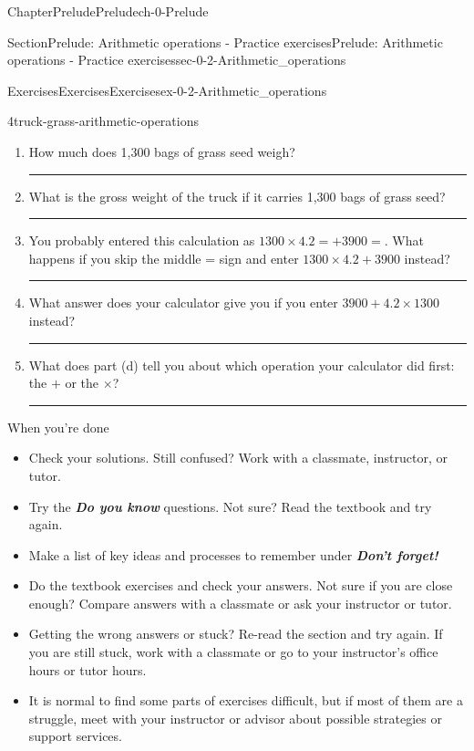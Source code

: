 \documentclass[twoside,11pt,]{book}
\newcommand{\alert}[1]{\textbf{\textit{#1}}}
\newlength{\workspacestrutwidth}
\numberwithin{equation}{section}
\begin{document}
\begin{chapterptx}{Chapter}{Prelude}{}{Prelude}{}{}{ch-0-Prelude}
\begin{sectionptx}{Section}{Prelude: Arithmetic operations - Practice exercises}{}{Prelude: Arithmetic operations - Practice exercises}{}{}{sec-0-2-Arithmetic_operations}
\begin{exercises-subsection-numberless}{Exercises}{Exercises}{}{Exercises}{}{}{ex-0-2-Arithmetic_operations}
\begin{divisionexercise}{4}{}{}{truck-grass-arithmetic-operations}
\begin{enumerate}[label=(\alph*),ref=\alph*]%
\item{}How much does 1,300 bags of grass seed weigh?%
\par\rule{\workspacestrutwidth}{0.35in}%
\item{}What is the gross weight of the truck if it carries 1,300 bags of grass seed?%
\par\rule{\workspacestrutwidth}{0.35in}%
\item{}You probably entered this calculation as \(1300 \times 4.2 = + 3900=\). What happens if you skip the middle = sign and enter \(1300 \times 4.2 + 3900\) instead?%
\par\rule{\workspacestrutwidth}{0.35in}%
\item{}What answer does your calculator give you if you enter \(3900 + 4.2 \times 1300\) instead?%
\par\rule{\workspacestrutwidth}{0.35in}%
\item{}What does part (d) tell you about which operation your calculator did first: the \(+\) or the \(\times\)?%
\par\rule{\workspacestrutwidth}{0.35in}%
\end{enumerate}%
\end{divisionexercise}%
\end{exercises-subsection-numberless}
\begin{conclusion}{When you're done \textellipsis{}}%
%
\begin{itemize}[label=\textbullet]
\item{}Check your solutions. Still confused? Work with a classmate, instructor, or tutor.%
\item{}Try the \alert{Do you know} questions. Not sure? Read the textbook and try again.%
\item{}Make a list of key ideas and processes to remember under \alert{Don't forget!}%
\item{}Do the textbook exercises and check your answers. Not sure if you are close enough? Compare answers with a classmate or ask your instructor or tutor.%
\item{}Getting the wrong answers or stuck? Re-read the section and try again. If you are still stuck, work with a classmate or go to your instructor's office hours or tutor hours.%
\item{}It is normal to find some parts of exercises difficult, but if most of them are a struggle, meet with your instructor or advisor about possible strategies or support services.%

\end{itemize}
\end{conclusion}
\end{sectionptx}
\end{chapterptx}
\end{document}
